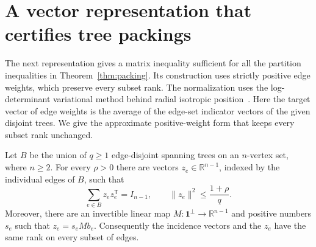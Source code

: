\section{A vector representation that certifies tree packings}
\label{sec:auxiliary}

The next representation gives a matrix inequality sufficient for all the
partition inequalities in Theorem~\ref{thm:packing}. Its construction uses
strictly positive edge weights, which preserve every subset rank.
The normalization uses the log-determinant variational method behind
radial isotropic position~\cite[Section~2.2]{Barthe1998}. Here the target
vector of edge weights is the average of the edge-set indicator vectors
of the given disjoint trees. We give the approximate positive-weight form
that keeps every subset rank unchanged.

\begin{lemma}
\label{lem:auxiliary-representation}
Let $B$ be the union of $q\geq1$ edge-disjoint spanning trees on an
$n$-vertex set, where $n\geq2$.  For every $\rho>0$ there are vectors
$z_e\in\mathbb R^{n-1}$, indexed by the individual edges of $B$, such that
\begin{equation}
 \sum_{e\in B}z_ez_e^{\mathsf T}=I_{n-1},
 \qquad \|z_e\|^2\leq\frac{1+\rho}{q}.
 \label{eq:auxiliary-isotropy}
\end{equation}
Moreover, there are an invertible linear map $M:\mathbf1^\perp\to
\mathbb R^{n-1}$ and positive numbers $s_e$ such that $z_e=s_eMb_e$.
Consequently the incidence vectors and the $z_e$ have the same rank on
every subset of edges.
\end{lemma}

